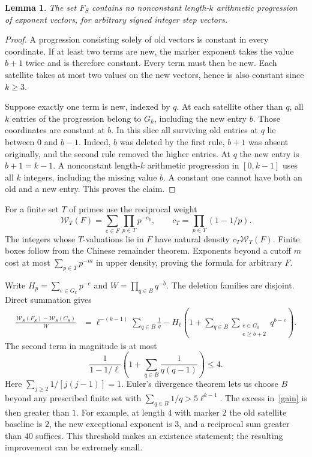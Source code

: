\documentclass[11pt]{article}
\newtheorem{lemma}[theorem]{Lemma}
\newcommand{\weight}{\mathcal W}
\begin{document}
\begin{lemma}\label{avoid}
The set $F_S$ contains no nonconstant length-$k$ arithmetic progression of exponent vectors, for arbitrary signed integer step vectors.
\end{lemma}
\begin{proof}
A progression consisting solely of old vectors is constant in every coordinate. If at least two terms are new, the marker exponent takes the value $b+1$ twice and is therefore constant. Every term must then be new. Each satellite takes at most two values on the new vectors, hence is also constant since $k\ge3$.

Suppose exactly one term is new, indexed by $q$. At each satellite other than $q$, all $k$ entries of the progression belong to $G_k$, including the new entry $b$. Those coordinates are constant at $b$. In this slice all surviving old entries at $q$ lie between $0$ and $b-1$. Indeed, $b$ was deleted by the first rule, $b+1$ was absent originally, and the second rule removed the higher entries. At $q$ the new entry is $b+1=k-1$. A nonconstant length-$k$ arithmetic progression in $[0,k-1]$ uses all $k$ integers, including the missing value $b$. A constant one cannot have both an old and a new entry. This proves the claim.
\end{proof}

For a finite set $T$ of primes use the reciprocal weight
\[
 \weight_T(F)=\sum_{e\in F}\prod_{p\in T}p^{-e_p},\qquad c_T=\prod_{p\in T}(1-1/p).
\]
The integers whose $T$-valuations lie in $F$ have natural density $c_T\weight_T(F)$. Finite boxes follow from the Chinese remainder theorem. Exponents beyond a cutoff $m$ cost at most $\sum_{p\in T}p^{-m}$ in upper density, proving the formula for arbitrary $F$.

Write $H_p=\sum_{e\in G_k}p^{-e}$ and $W=\prod_{q\in B}q^{-b}$. The deletion families are disjoint. Direct summation gives
\begin{align}
 \frac{\weight_S(F_S)-\weight_S(C_S)}{W}
    &=\ell^{-(k-1)}\sum_{q\in B}\frac1q
       -H_\ell\left(1+\sum_{q\in B}\sum_{\substack{e\in G_k\\ e\ge b+2}} q^{b-e}\right).\label{gain}
\end{align}
The second term in magnitude is at most
\[
       \frac{1}{1-1/\ell}\left(1+\sum_{q\in B}\frac1{q(q-1)}\right)
       \le4 .
\]
Here $\sum_{j\ge2}1/[j(j-1)]=1$. Euler's divergence theorem lets us choose $B$ beyond any prescribed finite set with $\sum_{q\in B}1/q>5\ell^{k-1}$. The excess in~\eqref{gain} is then greater than $1$. For example, at length $4$ with marker $2$ the old satellite baseline is $2$, the new exceptional exponent is $3$, and a reciprocal sum greater than $40$ suffices. This threshold makes an existence statement; the resulting improvement can be extremely small.
\end{document}
